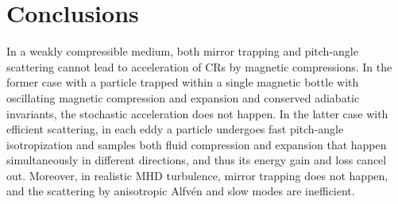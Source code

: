 \documentclass[preprint2,twocolumn,times,tighten]{aastex63}
\begin{document}
{%





\section{Conclusions}

In a weakly compressible medium, 
both mirror trapping and pitch-angle scattering cannot lead to acceleration of CRs by magnetic compressions. 
In the former case with a 
particle trapped within a single magnetic bottle with 
oscillating magnetic compression and expansion and conserved adiabatic invariants, the stochastic acceleration does not happen.
In the latter case with efficient scattering, in each eddy a particle 
undergoes fast pitch-angle isotropization 
and 
samples both fluid compression and expansion 
that happen simultaneously in different directions, and thus its energy gain and loss cancel out. 
Moreover, in realistic MHD turbulence, 
mirror trapping does not happen, and the 
scattering by anisotropic Alfv\'{e}n and slow modes are inefficient. 



}
\end{document}
